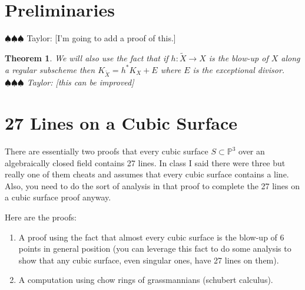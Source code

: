 \documentclass[12pt]{article}
\numberwithin{equation}{section}
\newtheorem{theorem}{Theorem}[subsection]
\theoremstyle{definition}
\theoremstyle{remark}
\newcommand{\PP}{\mathbb{P}}
\newcommand{\Bl}{\operatorname{Bl}}
\newcommand{\taylor}[1]{{\color{blue} \sf $\spadesuit\spadesuit\spadesuit$ Taylor: [#1]}}
\begin{document}

\section{Preliminaries}
\taylor{I'm going to add a proof of this.}
\begin{theorem}\label{thm:canonical-of-blow-up}
	We will also use the fact that if $h:\widetilde{X} \to X$ is the blow-up of $X$ along a regular subscheme then $K_{\widetilde{X}} = h^*K_X+E$ where $E$ is the exceptional divisor. \taylor{this can be improved}
\end{theorem}

\section{27 Lines on a Cubic Surface}
There are essentially two proofs that every cubic surface $S\subset \PP^3$ over an algebraically closed field contains 27 lines. 
In class I said there were three but really one of them cheats and assumes that every cubic surface contains a line. 
Also, you need to do the sort of analysis in that proof to complete the 27 lines on a cubic surface proof anyway.

Here are the proofs:
\begin{enumerate}
	\item A proof using the fact that almost every cubic surface is the blow-up of 6 points in general position (you can leverage this fact to do some analysis to show that any cubic surface, even singular ones, have 27 lines on them).
	\item A computation using chow rings of grassmannians (schubert calculus).
\end{enumerate}
\end{document}
